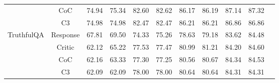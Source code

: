 \begin{table*}[h!]
{\begin{tabular}{lcccccccccc}
    & CoC & 74.94  & 75.34  & 82.60  & 82.62  & 86.17  & 86.19  & 87.14  & 87.32  \\ 
    & C3 & 74.98  & 74.98  & 82.47  & 82.47  & 86.21  & 86.21  & 86.86  & 86.86  \\ 
    \midrule
    \multirow{4}{*}{TruthfulQA} 
    & Response & 67.81  & 69.50  & 74.33  & 75.26  & 78.63  & 79.18  & 83.62  & 84.48  \\ 
    & Critic & 62.12  & 65.22  & 77.53  & 77.47  & 80.99  & 81.21  & 84.20  & 84.60  \\ 
    & CoC & 62.16  & 63.33  & 77.30  & 77.25  & 80.56  & 80.67  & 84.34  & 84.53  \\ 
    & C3 & 62.09  & 62.09  & 78.00  & 78.00  & 80.64  & 80.64  & 84.31  & 84.31  \\ 
    \bottomrule
\end{tabular}
}
\end{table*}